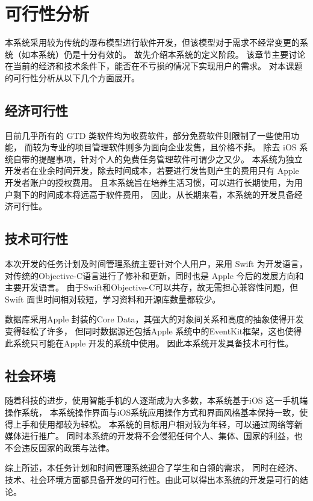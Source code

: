 \chapter{可行性分析}
本系统采用较为传统的瀑布模型进行软件开发，但该模型对于需求不经常变更的系统（如本系统）仍是十分有效的。
故先介绍本系统的定义阶段。
该章节主要讨论在当前的经济和技术条件下，能否在不亏损的情况下实现用户的需求。
对本课题的可行性分析从以下几个方面展开。
\section{经济可行性}
目前几乎所有的 GTD 类软件均为收费软件，部分免费软件则限制了一些使用功能，
而较为专业的项目管理软件则多为面向企业发售，且价格不菲。
除去 iOS 系统自带的提醒事项，针对个人的免费任务管理软件可谓少之又少。
本系统为独立开发者在业余时间开发，除去时间成本，若要进行发售则产生的费用只有 Apple 开发者账户的授权费用。
且本系统旨在培养生活习惯，可以进行长期使用，为用户剩下的时间成本将远高于软件费用，
因此，从长期来看，本系统的开发具备经济可行性。

\section{技术可行性}
本次开发的任务计划及时间管理系统主要针对个人用户，采用 Swift 为开发语言，
对传统的Objective-C语言进行了修补和更新，同时也是 Apple 今后的发展方向和主要开发语言。
由于Swift和Objective-C可以共存，故无需担心兼容性问题，但 Swift 面世时间相对较短，学习资料和开源库数量都较少。

数据库采用Apple 封装的Core Data，其强大的对象间关系和高度的抽象使得开发变得轻松了许多，
但同时数据源还包括Apple 系统中的EventKit框架，这也使得此系统只可能在Apple 开发的系统中使用。
因此本系统开发具备技术可行性。

\section{社会环境}
随着科技的进步，使用智能手机的人逐渐成为大多数，本系统基于iOS 这一手机端操作系统，
本系统操作界面与iOS系统应用操作方式和界面风格基本保持一致，使得上手和使用都较为轻松。
本系统的目标用户相对较为年轻，可以通过网络等新媒体进行推广。
同时本系统的开发将不会侵犯任何个人、集体、国家的利益，也不会违反国家的政策与法律。

综上所述，本任务计划和时间管理系统迎合了学生和白领的需求，
同时在经济、技术、社会环境方面都具备开发的可行性。由此可以得出本系统的开发是可行的结论。